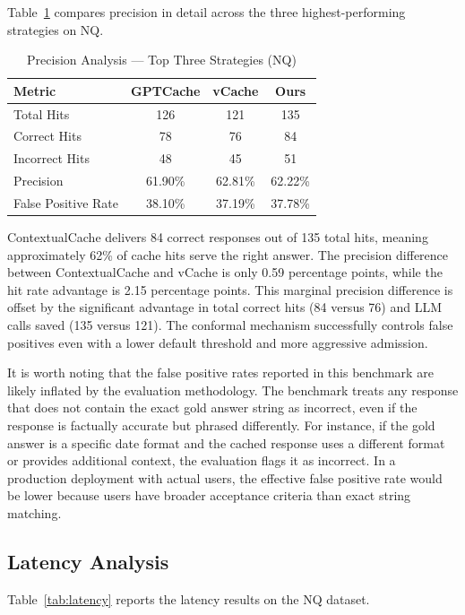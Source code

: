 \documentclass[conference]{IEEEtran}
\begin{document}
Table~\ref{tab:precision} compares precision in detail across the three highest-performing strategies on NQ.

\begin{table}[t]
\centering
\caption{Precision Analysis --- Top Three Strategies (NQ)}
\label{tab:precision}
\begin{tabular}{lccc}
\toprule
\textbf{Metric} & \textbf{GPTCache} & \textbf{vCache} & \textbf{Ours} \\
\midrule
Total Hits & 126 & 121 & 135 \\
Correct Hits & 78 & 76 & 84 \\
Incorrect Hits & 48 & 45 & 51 \\
Precision & 61.90\% & 62.81\% & 62.22\% \\
False Positive Rate & 38.10\% & 37.19\% & 37.78\% \\
\bottomrule
\end{tabular}
\end{table}

ContextualCache delivers 84 correct responses out of 135 total hits, meaning approximately 62\% of cache hits serve the right answer. The precision difference between ContextualCache and vCache is only 0.59 percentage points, while the hit rate advantage is 2.15 percentage points. This marginal precision difference is offset by the significant advantage in total correct hits (84 versus 76) and LLM calls saved (135 versus 121). The conformal mechanism successfully controls false positives even with a lower default threshold and more aggressive admission.

It is worth noting that the false positive rates reported in this benchmark are likely inflated by the evaluation methodology. The benchmark treats any response that does not contain the exact gold answer string as incorrect, even if the response is factually accurate but phrased differently. For instance, if the gold answer is a specific date format and the cached response uses a different format or provides additional context, the evaluation flags it as incorrect. In a production deployment with actual users, the effective false positive rate would be lower because users have broader acceptance criteria than exact string matching.

\subsection{Latency Analysis}

Table~\ref{tab:latency} reports the latency results on the NQ dataset.
\end{document}
